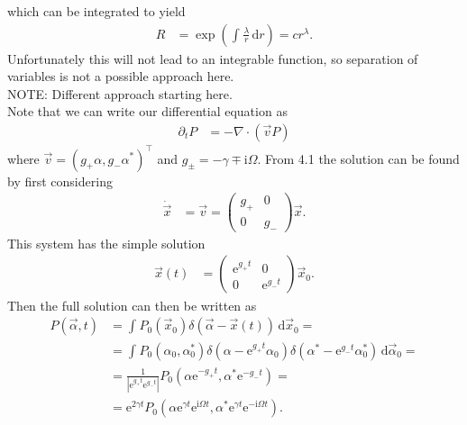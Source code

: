 \documentclass[english, parskip=full]{scrartcl}
\newcommand{\intx}{}
\newcommand{\kla}{}
\renewcommand{\i}{\text{i}}
\newcommand{\e}{\text{e}}
\begin{document}
which can be integrated to yield
\begin{align}
 R &= \exp\kla\left( \intx\int_{ }^{ } \frac{\lambda}{r} \, \mathrm{d}r \right) = cr^\lambda .
\end{align}
Unfortunately this will not lead to an integrable function, so separation of variables is not a possible approach here.
\\
NOTE: Different approach starting here.
\\
Note that we can write our differential equation as
\begin{align}
\partial_t P &= -\nabla\cdot \kla\left( \vec{v}P \right)
\end{align}
where $\vec{v} = \kla\left( g_+\alpha, g_-\alpha^\ast \right)^\top$ and $g_\pm = -\gamma \mp \i\Omega$.
From 4.1 the solution can be found by first considering
\begin{align}
\dot{\vec{x}} &= \vec{v} = \begin{pmatrix}
g_+ & 0 \\ 0 & g_- 
\end{pmatrix} \vec{x}.
\end{align}
This system has the simple solution
\begin{align}
\vec{x}(t) &= \begin{pmatrix}
\e^{g_+ t} & 0 \\ 0 & \e^{g_- t}
\end{pmatrix} \vec{x}_0.
\end{align}
Then the full solution can then be written as
\begin{align}
P(\vec{\alpha},t) &= \intx\int_{ }^{ } P_0(\vec{x}_0) \delta\kla\left( \vec{\alpha} - \vec{x}(t) \right) \, \mathrm{d}\vec{x}_0 = \\
&= \intx\int_{ }^{ } P_0(\alpha_0,\alpha_0^\ast) \delta\kla\left(
\alpha - \e^{g_+t}\alpha_0 
 \right) \delta\kla\left( \alpha^\ast - \e^{g_-t}\alpha_0^\ast \right) \, \mathrm{d}\vec{\alpha}_0 = \\
 &=  \frac{1}{|\e^{g_+t}\e^{g_-t}|} P_0 \kla\left( \alpha\e^{-g_+t}, \alpha^\ast\e^{-g_-t} \right) = \\
 &= \e^{2\gamma t} P_0\kla\left( \alpha\e^{\gamma t}\e^{\i\Omega t}, \alpha^\ast\e^{\gamma t} \e^{-\i\Omega t} \right).
\end{align}
\end{document}

